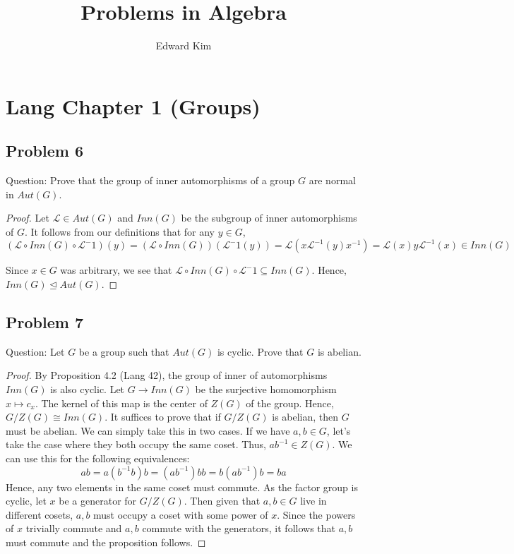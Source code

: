 \documentclass[12pt]{article}
\title{Problems in Algebra}
\author{Edward Kim}
\begin{document}
\hrulefill

\section*{Lang Chapter 1 (Groups)}
\subsection*{Problem 6}

Question: Prove that the group of inner automorphisms of a group $G$ are normal in $Aut(G)$. \par
\begin{proof}
Let $\mathcal{L} \in Aut(G)$ and $Inn(G)$ be the subgroup of inner automorphisms of $G$. It follows from our definitions that for any $y \in G$,  $$(\mathcal{L} \circ Inn(G) \circ \mathcal{L}^-1)(y) = (\mathcal{L} \circ Inn(G)) (\mathcal{L}^-1(y)) = \mathcal{L}(x \mathcal{L}^{-1}(y) x^{-1}) = \mathcal{L}(x) y \mathcal{L}^{-1}(x) \in Inn(G)$$

Since $x \in G$ was arbitrary, we see that $\mathcal{L} \circ Inn(G) \circ \mathcal{L}^-1 \subseteq Inn(G)$. Hence, $Inn(G) \trianglelefteq Aut(G)$. \end{proof}

\subsection*{Problem 7}

Question: Let $G$ be a group such that $Aut(G)$ is cyclic. Prove that $G$ is abelian.

\begin{proof}
By Proposition 4.2 (Lang 42), the group of inner of automorphisms $Inn(G)$ is also cyclic. Let $G \rightarrow Inn(G)$ be the surjective homomorphism $x \mapsto c_x$. The kernel of this map is the center of $Z(G)$ of the group. Hence, $G/Z(G) \cong Inn(G)$. It suffices to prove that if $G/Z(G)$ is abelian, then $G$ must be abelian. We can simply take this in two cases. If we have $a,b \in G$, let's take the case where they both occupy the same coset. Thus, $ab^{-1} \in Z(G)$. We can use this for the following equivalences:
 $$ ab = a(b^{-1}b)b = (ab^{-1})bb = b(ab^{-1})b = ba$$
 Hence, any two elements in the same coset must commute. As the factor group is cyclic, let $x$ be a generator for $G/Z(G)$. Then given that $a,b \in G$ live in different cosets, $a,b$ must occupy a coset with some power of $x$. Since the powers of $x$ trivially commute and $a,b$ commute with the generators, it follows that $a,b$ must commute and the proposition follows.
\end{proof}
\end{document}
